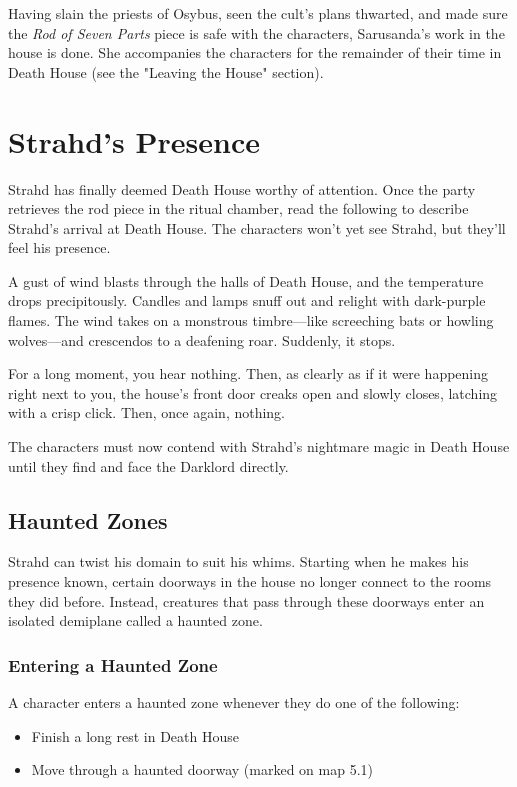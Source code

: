 \documentclass[10pt,a4paper,twoside,bg=print,twocolumn,openany,nodeprecatedcode]{dndbook}
\begin{document}
Having slain the priests of Osybus, seen the cult's plans thwarted, and made sure the \textit{Rod of Seven Parts} piece is safe with the characters, Sarusanda's work in the house is done. She accompanies the characters for the remainder of their time in Death House (see the "Leaving the House" section).

\section{Strahd's Presence}
Strahd has finally deemed Death House worthy of attention. Once the party retrieves the rod piece in the ritual chamber, read the following to describe Strahd's arrival at Death House. The characters won't yet see Strahd, but they'll feel his presence.

\begin{DndReadAloud}{}
A gust of wind blasts through the halls of Death House, and the temperature drops precipitously. Candles and lamps snuff out and relight with dark-purple flames. The wind takes on a monstrous timbre—like screeching bats or howling wolves—and crescendos to a deafening roar. Suddenly, it stops.

For a long moment, you hear nothing. Then, as clearly as if it were happening right next to you, the house's front door creaks open and slowly closes, latching with a crisp click. Then, once again, nothing.

\end{DndReadAloud}

The characters must now contend with Strahd's nightmare magic in Death House until they find and face the Darklord directly.

\subsection{Haunted Zones}
Strahd can twist his domain to suit his whims. Starting when he makes his presence known, certain doorways in the house no longer connect to the rooms they did before. Instead, creatures that pass through these doorways enter an isolated demiplane called a haunted zone.

\subsubsection{Entering a Haunted Zone}
A character enters a haunted zone whenever they do one of the following:


\begin{itemize}
\item Finish a long rest in Death House
\item Move through a haunted doorway (marked on map 5.1)
\end{itemize}
\end{document}
